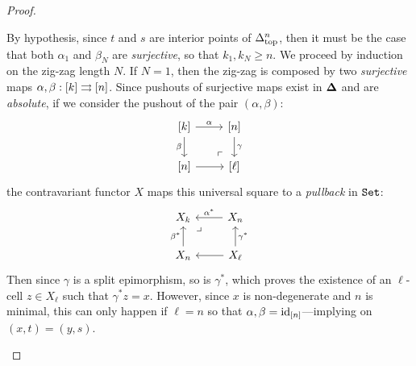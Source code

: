 \begin{proof}
\begin{itemize}
              By hypothesis, since \(t\) and \(s\) are interior points of \(\Delta_{\text{top}}^n\), then
              it must be the case that both \(\alpha_1\) and \(\beta_N\) are
              \emph{surjective}, so that \(k_1, k_N \geq n\). We proceed by induction on the
              zig-zag length \(N\). If \(N = 1\), then the zig-zag is composed by two
              \emph{surjective} maps \(\alpha, \beta: [k] \rightrightarrows [n]\). Since pushouts of
              surjective maps exist in \({\mathbf{\Delta}}\) and are \emph{absolute}, if we consider the
              pushout of the pair \((\alpha, \beta)\):
              \[
                  \begin{tikzcd}
                      {[k]} \ar[r, "\alpha"]
                      \ar[d, "\beta"']
                      \ar[rd, phantom, "\ulcorner", very near end]
                      &{[n]} \ar[d, "\gamma"] \\
                      {[n]} \ar[r] &{[\ell]}
                  \end{tikzcd}
              \]
              the contravariant functor \(X\) maps this universal square to a
              \emph{pullback} in \({\texttt{Set}}\):
              \[
                  \begin{tikzcd}
                      X_k \ar[rd, "\lrcorner", very near start, phantom]
                      &X_n \ar[l, "\alpha^{*}"'] \\
                      X_n \ar[u, "\beta^{*}"]
                      &X_{\ell} \ar[u, "\gamma^{*}"'] \ar[l]
                  \end{tikzcd}
              \]
              Then since \(\gamma\) is a split epimorphism, so is \(\gamma^{*}\), which
              proves the existence of an \(\ell\)-cell \(z \in X_{\ell}\) such that
              \(\gamma^{*} z = x\). However, since \(x\) is non-degenerate and \(n\) is
              minimal, this can only happen if \(\ell = n\) so that \(\alpha, \beta =
              \operatorname{id}_{[n]}\)---implying on \((x, t) = (y, s)\).


\end{itemize}
\end{proof}
